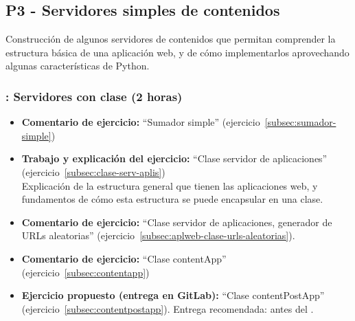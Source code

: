 \documentclass[a4paper,12pt]{article}
\begin{document}
\subsection{P3 - Servidores simples de contenidos}

Construcción de algunos servidores de contenidos que permitan comprender la estructura básica de una aplicación web, y de cómo implementarlos aprovechando algunas características de Python.

\subsubsection{\juevesF: Servidores con clase (2 horas)}
\label{cal:juevesF}

\begin{itemize}
\item \textbf{Comentario de ejercicio:} ``Sumador simple'' (ejercicio~\ref{subsec:sumador-simple}) 
\item \textbf{Trabajo y explicación del ejercicio:} ``Clase servidor de aplicaciones'' (ejercicio~\ref{subsec:clase-serv-aplis}) \\
  Explicación de la estructura general que tienen las aplicaciones web, y fundamentos de cómo esta estructura se puede encapsular en una clase.
\item \textbf{Comentario de ejercicio:} ``Clase servidor de aplicaciones, generador de URLs aleatorias'' (ejercicio~\ref{subsec:aplweb-clase-urls-aleatorias}). 
 \item \textbf{Comentario de ejercicio:}  ``Clase contentApp'' (ejercicio~\ref{subsec:contentapp}) 
 \item \textbf{Ejercicio propuesto (entrega en GitLab):} ``Clase contentPostApp'' (ejercicio~\ref{subsec:contentpostapp}).
  Entrega recomendada: antes del \juevesG.
\end{itemize}


\end{document}
